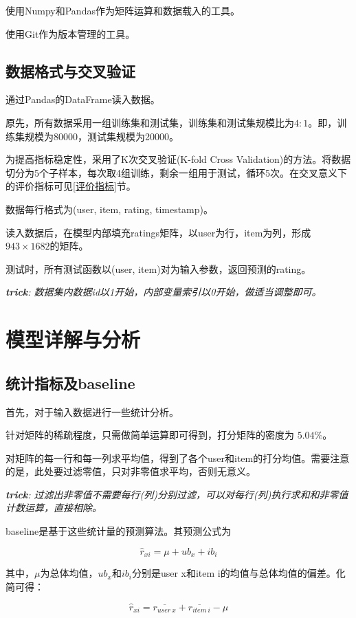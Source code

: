 \documentclass[utf8, a4paper,11pt, onecolumn]{ctexart}
\begin{document}
\begin{spacing}{1.3}
使用Numpy和Pandas作为矩阵运算和数据载入的工具。

使用Git作为版本管理的工具。

\subsection{数据格式与交叉验证}

通过Pandas的DataFrame读入数据。

原先，所有数据采用一组训练集和测试集，训练集和测试集规模比为$4:1$。即，训练集规模为80000，测试集规模为20000。

为提高指标稳定性，采用了K次交叉验证(K-fold Cross Validation)的方法。将数据切分为5个子样本，每次取4组训练，剩余一组用于测试，循环5次。在交叉意义下的评价指标可见\ref{评价指标}节。

数据每行格式为(user, item, rating, timestamp)。

读入数据后，在模型内部填充ratings矩阵，以user为行，item为列，形成$943 \times 1682$的矩阵。

测试时，所有测试函数以(user, item)对为输入参数，返回预测的rating。

\textit{\textbf{trick}: 数据集内数据id以1开始，内部变量索引以0开始，做适当调整即可。}
\section{模型详解与分析}
\label{模型详解}
\subsection{统计指标及baseline}

首先，对于输入数据进行一些统计分析。

针对矩阵的稀疏程度，只需做简单运算即可得到，打分矩阵的密度为 $5.04\%$。

对矩阵的每一行和每一列求平均值，得到了各个user和item的打分均值。需要注意的是，此处要过滤零值，只对非零值求平均，否则无意义。

\textit{\textbf{trick}: 过滤出非零值不需要每行(列)分别过滤，可以对每行(列)执行求和和非零值计数运算，直接相除。}

baseline是基于这些统计量的预测算法。其预测公式为

\[\hat{r}_{xi} = \mu + ub_{x} + ib_{i}\]

其中，$\mu$为总体均值，$ub_{x}$和$ib_{i}$分别是user x和item i的均值与总体均值的偏差。化简可得：

\[\hat{r}_{xi} = \overline{r_{user\ x}}+ \overline{r_{item\ i}} - \mu\]


\end{spacing}
\end{document}

